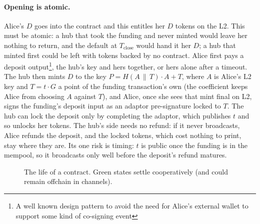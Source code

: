 \documentclass[11pt]{article}
\newcommand{\vmax}{V_{\max}}
\newcommand{\Tc}{T_{\mathrm{close}}}
\begin{document}
\paragraph{Opening is atomic.} Alice's $D$ goes into the contract and this entitles her
$D$ tokens on the L2. This must be atomic: a hub
that took the funding and never minted would leave her nothing to
return, and the default at $\Tc$ would hand it her $D$; a hub that
minted first could be left with tokens backed by no contract. Alice
first pays a deposit output\footnote{A well known design pattern to avoid the need for Alice's external wallet to support some kind of co-signing event}, the hub's key and hers together, or hers
alone after a timeout. The hub then mints $D$ to the key
$P = H(A \,\|\, T)\cdot A + T$, where $A$ is Alice's L2 key and $T = t\cdot G$
a point of the funding transaction's own (the coefficient keeps Alice
from choosing $A$ against $T$), and Alice, once she sees that mint
final on L2, signs the funding's deposit input as an adaptor pre-signature
locked to $T$. The hub can lock the deposit only by completing the adaptor,
which publishes $t$ and so unlocks her tokens. The hub's side needs no
refund: if it never broadcasts, Alice refunds the deposit, and the
locked tokens, which cost nothing to print, stay where they are. Its one
risk is timing: $t$ is public once the funding is in the mempool, so it
broadcasts only well before the deposit's refund matures.

\begin{figure}[H]
\centering
{}
\caption{The life of a contract. Green states settle
cooperatively (and could remain offchain in channels).}
\label{fig:life}
\end{figure}
\end{document}
